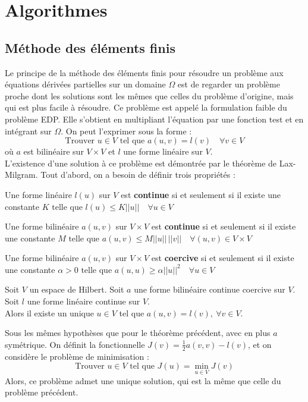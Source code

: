 \chapter{Algorithmes}

\section{Méthode des éléments finis}
\label{eltfinis}
Le principe de la méthode des éléments finis pour résoudre un problème aux équations dérivées partielles sur un domaine $\Omega$ est de regarder un problème proche dont les solutions sont les mêmes que celles du problème d'origine, mais qui est plus facile à résoudre. Ce problème est appelé la formulation faible du problème EDP. Elle s'obtient en multipliant l'équation par une fonction test et en intégrant sur $\Omega$. On peut l'exprimer sous la forme :
\[ \mbox{Trouver } u \in V \mbox{ tel que } a(u,v)=l(v)\quad \forall v\in V \]
où $a$ est bilinéaire sur $V\times V$ et $l$ une forme linéaire sur $V$.\\

L'existence d'une solution à ce problème est démontrée par le théorème de Lax-Milgram. Tout d'abord, on a besoin de définir trois propriétés :
\begin{mydef}
Une forme linéaire $l(u)$ sur $V$ est {\bf continue} si et seulement si il existe une constante $K \mbox{ telle que } l(u)\leq K||u||\quad \forall u\in V$
\end{mydef}
\begin{mydef}
Une forme bilinéaire $a(u,v)$ sur $V\times V$ est {\bf continue} si et seulement si il existe une constante $M \mbox{ telle que } a(u,v)\leq M||u||\,||v||\quad \forall (u,v)\in V\times V$
\end{mydef}
\begin{mydef}
Une forme bilinéaire $a(u,v)$ sur $V\times V$ est {\bf coercive} si et seulement si il existe une constante $\alpha>0 \mbox{ telle que } a(u,u)\geq \alpha ||u||^2\quad \forall u\in V$
\end{mydef}

\begin{thm}
Soit $V$ un espace de Hilbert. Soit $a$ une forme bilinéaire continue coercive sur $V$. Soit $l$ une forme linéaire continue sur $V$.\\
Alors il existe un unique $u\in V$ tel que $a(u,v)=l(v),\ \forall v\in V$.\\
\end{thm}

\begin{thm}
Sous les mêmes hypothèses que pour le théorème précédent, avec en plus $a$ symétrique. On définit la fonctionnelle $J(v)=\frac{1}{2}a(v,v)-l(v)$, et on considère le problème de minimisation :
\[ \mbox{Trouver }u\in V \mbox{ tel que } J(u)=\min_{u\in V} J(v) \]
Alors, ce problème admet une unique solution, qui est la même que celle du problème précédent.
\end{thm}

